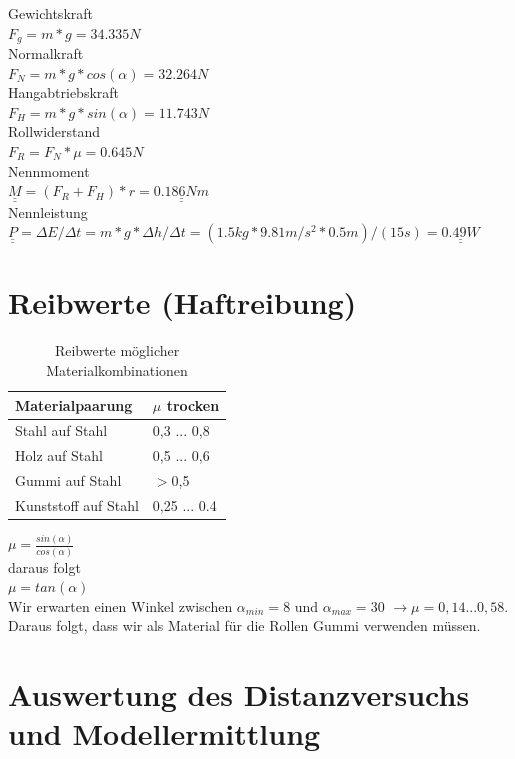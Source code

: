 \documentclass[a4paper]{report}
\begin{document}
\noindent
Gewichtskraft\\
$F_{g}=m*g=34.335 N$	\\
Normalkraft	\\
$F_{N}=m*g*cos(\alpha)=32.264 N$	\\
Hangabtriebskraft	\\
$F_{H}=m*g*sin(\alpha)=11.743 N$	\\
Rollwiderstand	\\
$F_{R}=F_{N}*\mu=0.645 N$	\\
Nennmoment	\\
$\underline{\underline{M}}=(F_{R}+F_{H})*r=\underline{\underline{0.186 Nm}}$	\\
Nennleistung	\\
$\underline{\underline{P}}=\Delta E/\Delta t=m*g*\Delta h/\Delta t=(1.5kg*9.81m/s^2*0.5m)/(15s)=\underline{\underline{0.49W}}$\\

\section{Reibwerte (Haftreibung)}
\label{ssec:ReibWer}

\begin{table}[h!]
	\centering
	\begin{tabular}{|p{}|p{}|}
		\hline
		\textbf{Materialpaarung} & \textbf{$\mu$ trocken}\\
		\hline
		Stahl auf Stahl & 0,3 ... 0,8 \\
		\hline
		Holz auf Stahl & 0,5 ... 0,6\\
		\hline
		Gummi auf Stahl & $>$0,5 \\
		\hline
		Kunststoff auf Stahl & 0,25 ... 0.4\\
		\hline
	\end{tabular}
	\caption{Reibwerte möglicher Materialkombinationen \parencite{Wittel2015}}
	\label{tab:Reibwerte}
\end{table}

\noindent
$\mu=\frac{sin(\alpha)}{cos(\alpha)}$\\

\noindent
daraus folgt\\
$\mu=tan(\alpha)$\\
Wir erwarten einen Winkel zwischen $\alpha_{min}=8$ und $\alpha_{max}=30$ $ \rightarrow \mu = 0,14 ... 0,58$. Daraus folgt, dass wir als Material für die Rollen Gummi verwenden müssen.

\section{Auswertung des Distanzversuchs und Modellermittlung}
\label{ssec:DistModelCreation}
\end{document}
